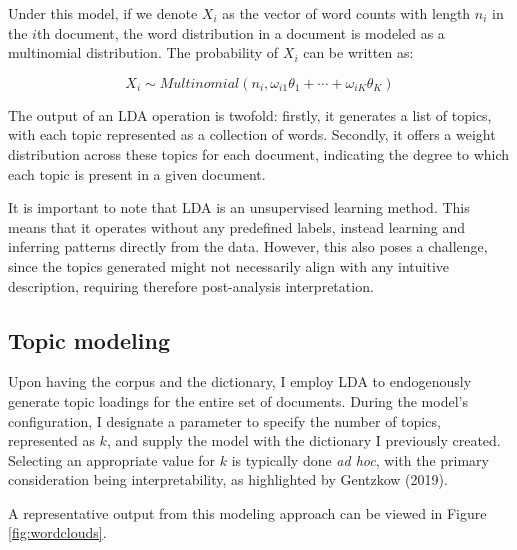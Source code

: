 \documentclass[12pt, letterpaper]{article}
\begin{document}
Under this model, if we denote $X_i$ as the vector of word counts with length $n_i$ in the $i$th document, the word distribution in a document is modeled as a multinomial distribution. The probability of $X_i$ can be written as:

\begin{equation}
X_i \sim Multinomial\left(n_i, \omega_{i 1} \theta_1+\cdots+\omega_{i K} \theta_K\right)
\end{equation}


The output of an LDA operation is twofold: firstly, it generates a list of topics, with each topic represented as a collection of words. Secondly, it offers a weight distribution across these topics for each document, indicating the degree to which each topic is present in a given document.

It is important to note that LDA is an unsupervised learning method. This means that it operates without any predefined labels, instead learning and inferring patterns directly from the data. However, this also poses a challenge, since the topics generated might not necessarily align with any intuitive description, requiring therefore post-analysis interpretation. %

\subsection{Topic modeling}

Upon having the corpus and the dictionary, I employ LDA to endogenously generate topic loadings for the entire set of documents. During the model's configuration, I designate a parameter to specify the number of topics, represented as \(k\), and supply the model with the dictionary I previously created. Selecting an appropriate value for \(k\) is typically done \textit{ad hoc}, with the primary consideration being interpretability, as highlighted by Gentzkow (2019).

A representative output from this modeling approach can be viewed in Figure \ref{fig:wordclouds}.


\end{document}
